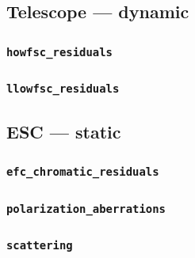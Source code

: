 \subsection{Telescope --- dynamic}
\label{sec:telescope-dynamic}


\subsubsection{\texttt{howfsc\_residuals}}
\label{sec:telescope-dynamic-howfsc-residuals}


\subsubsection{\texttt{llowfsc\_residuals}}
\label{sec:telescope-dynamic-llowfsc-residuals}


\subsection{ESC --- static}
\label{sec:esc-static}


\subsubsection{\texttt{efc\_chromatic\_residuals}}
\label{sec:esc-static-efc-chromatic-residuals}


\subsubsection{\texttt{polarization\_aberrations}}
\label{sec:esc-static-polarization-aberrations}


\subsubsection{\texttt{scattering}}
\label{sec:esc-static-scattering}


